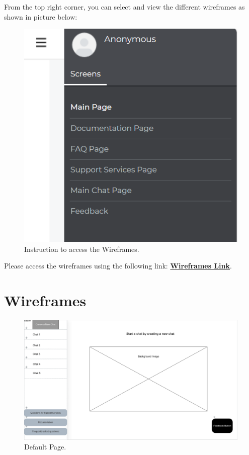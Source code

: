 \documentclass{l4proj}
\begin{document}
\begin{appendices}
From the top right corner, you can select and view the different wireframes as shown in picture below:
\begin{figure}[h!]
  \centering
  \begin{adjustbox}{center,max height=0.4\textheight, max width=\linewidth}
    \includegraphics{images/instructionjustinmind.png}
  \end{adjustbox}
  \caption{Instruction to access the Wireframes.}
\end{figure}

Please access the wireframes using the following link: 
\href{https://cloud.justinmind.com/usernote/prototype/32f43d89128931ea5ef39043b4898b3d943f1a4d570f702c6785805d01214a34}{\textbf{Wireframes Link}}.

\chapter{Wireframes}
\label{Wireframes}

\begin{figure}[h!]
  \centering
  \begin{adjustbox}{center,max height=0.4\textheight, max width=\linewidth}
    \includegraphics{images/wireframebackgroundpage.png}
  \end{adjustbox}
  \caption{Default Page.}
\end{figure}


\end{appendices}
\end{document}
